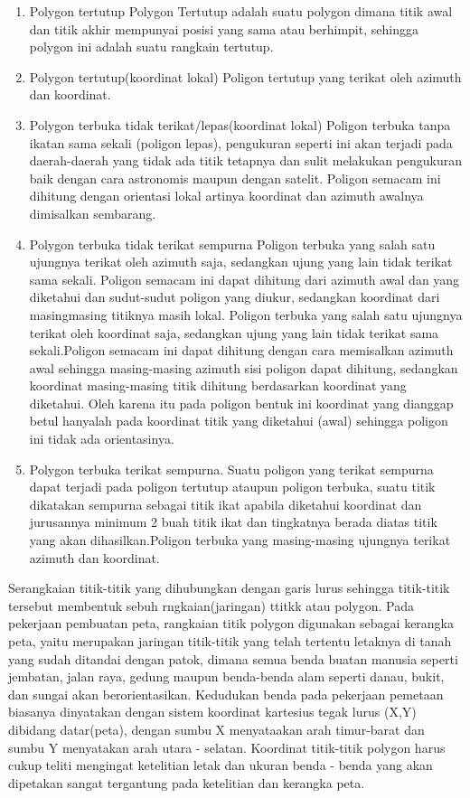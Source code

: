 \begin{enumerate}
\item Polygon tertutup
  Polygon Tertutup adalah suatu polygon dimana titik awal dan titik akhir mempunyai posisi yang sama atau berhimpit, sehingga polygon ini adalah suatu rangkain tertutup.
\item Polygon tertutup(koordinat lokal)
  Poligon tertutup yang terikat oleh azimuth dan koordinat.
\item Polygon terbuka tidak terikat/lepas(koordinat lokal)
  Poligon terbuka tanpa ikatan sama sekali (poligon lepas), pengukuran seperti ini akan terjadi pada daerah-daerah yang tidak ada titik tetapnya dan sulit melakukan pengukuran baik dengan cara astronomis maupun dengan satelit. Poligon semacam ini dihitung dengan orientasi lokal artinya koordinat dan azimuth awalnya dimisalkan sembarang.
\item Polygon terbuka tidak terikat sempurna
  Poligon terbuka yang salah satu ujungnya terikat oleh azimuth saja, sedangkan ujung yang lain tidak terikat sama sekali. Poligon semacam ini dapat dihitung dari azimuth awal dan yang diketahui dan sudut-sudut poligon yang diukur, sedangkan koordinat dari masingmasing titiknya masih lokal. Poligon terbuka yang salah satu ujungnya terikat oleh koordinat saja, sedangkan ujung yang lain tidak terikat sama sekali.Poligon semacam ini dapat dihitung dengan cara memisalkan azimuth awal sehingga masing-masing azimuth sisi poligon dapat dihitung, sedangkan koordinat masing-masing titik dihitung berdasarkan koordinat yang diketahui. Oleh karena itu pada poligon bentuk ini koordinat yang dianggap betul hanyalah pada koordinat titik yang diketahui (awal) sehingga poligon ini tidak ada orientasinya.
\item Polygon terbuka terikat sempurna.
  Suatu poligon yang terikat sempurna dapat terjadi pada poligon tertutup ataupun poligon terbuka, suatu titik dikatakan sempurna sebagai titik ikat apabila diketahui koordinat dan jurusannya minimum 2 buah titik ikat dan tingkatnya berada diatas titik yang akan dihasilkan.Poligon terbuka yang masing-masing ujungnya terikat azimuth dan koordinat.
\end{enumerate}
 
Serangkaian titik-titik yang dihubungkan dengan garis lurus sehingga titik-titik tersebut membentuk sebuh rngkaian(jaringan) ttitkk atau polygon. Pada pekerjaan pembuatan peta, rangkaian titik polygon digunakan sebagai  kerangka peta, yaitu merupakan jaringan titik-titik yang telah tertentu letaknya di tanah yang sudah ditandai dengan patok, dimana semua benda buatan manusia seperti jembatan, jalan raya, gedung maupun benda-benda alam seperti danau, bukit, dan sungai akan berorientasikan. Kedudukan benda pada pekerjaan pemetaan biasanya dinyatakan dengan sistem koordinat  kartesius tegak lurus (X,Y) dibidang datar(peta), dengan sumbu X menyataakan arah timur-barat dan sumbu Y menyatakan arah utara - selatan. Koordinat titik-titik polygon harus cukup teliti mengingat ketelitian letak dan ukuran benda - benda yang akan dipetakan sangat tergantung pada ketelitian dan kerangka peta.

